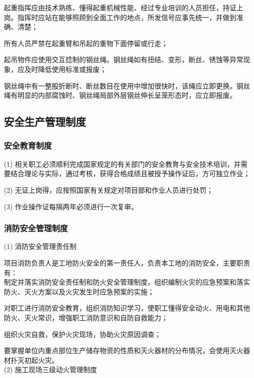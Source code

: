  起重指挥应由技术熟练、懂得起重机械性能、经过专业培训的人员担任，持证上岗。指挥时应站在能够照顾到全面工作的地点，所发信号应事先统一，并做到准确、清楚；

 所有人员严禁在起重臂和吊起的重物下面停留或行走；

 起吊物件应使用交互捻制的钢丝绳。钢丝绳如有扭结、变形，断丝、锈蚀等异常现象，应及时降低使用标准或报废；

 钢丝绳中有一整股折断时、断丝数目在使用中增加很快时，该绳应立即更换。钢丝绳有明显的内部腐蚀时、钢丝绳局部外层钢丝伸长呈笼形态时，应立即报废。\\

\subsection{安全生产管理制度}
\subsubsection{安全教育制度}

(1) 相关职工必须顺利完成国家规定的有关部门的安全教育与安全技术培训，并需要结合理论与实际，通过考核，获得合格成绩且被授予操作证后，方可独立作业；

(2) 无证上岗得，应按照国家有关规定对项目部和作业人员进行处罚；

(3) 作业操作证每隔两年必须进行一次复审。

\subsubsection{消防安全管理制度}

(1) 消防安全管理责任制

项目消防负责人是工地防火安全的第一责任人，负责本工地的消防安全，主要职责有：\\

 制定并落实消防安全责任制和防火安全管理制度，组织编制火灾的应急预案和落实防火、灭火方案以及火灾发生时应急预案的实施；

 对职工进行消防安全教育，组织消防知识学习，使职工懂得安全动火、用电和其他防火、灭火常识，增强职工消防意识和自防自救能力；

 组织火灾自救，保护火灾现场，协助火灾原因调查；

 要掌握单位内重点部位生产储存物资的性质和灭火器材的分布情况，会使用灭火器材扑灭初起火灾。\\

(2) 施工现场三级动火管理制度\\


